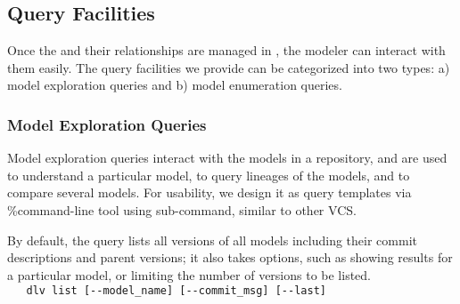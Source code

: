 \documentclass[conference]{IEEEtran}
\begin{document}
\subsection{Query Facilities}
\label{subsec:query}
Once the \dnn\models and their relationships are managed in \DLV, the modeler can interact with them easily. 
The query facilities we provide can be categorized into two types: a) model exploration queries and b) model enumeration queries. %


\subsubsection{Model Exploration Queries}
Model exploration queries interact with the models in a repository, and are used to
understand a particular model, to query lineages of the models, and to compare several models. 
For usability, we design it as %
query templates via \dlv\%command-line tool using 
sub-command, similar to other VCS. %


By default, the query lists all versions of all models including their commit descriptions and
parent versions; it also takes options, such as showing results for a particular model, or limiting
the number of versions to be listed. %
\\{\small{\verb|   dlv list [--model_name] [--commit_msg] [--last]|}}
\end{document}
